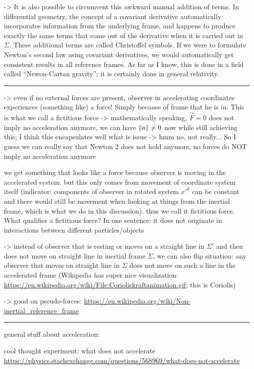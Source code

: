 \documentclass[../class_mech_main.tex]{subfiles}
\begin{document}
->  It is also possible to circumvent this awkward manual addition of terms. In differential geometry, the concept of a covariant derivative automatically incorporates information from the underlying frame, and happens to produce exactly the same terms that come out of the derivative when it is carried out in $\Sigma$. These additional terms are called Christoffel symbols. If we were to formulate Newton's second law using covariant derivatives, we would automatically get consistent results in all reference frames. As far as I know, this is done in a field called \enquote{Newon-Cartan gravity}; it is certainly done in general relativity.


\hrule


-> even if no external forces are present, observer in accelerating coordinates experiences (something like) a force! Simply because of frame that he is in. This is what we call a fictitious force -> mathematically speaking, $\vec{F} = 0$ does not imply no acceleration anymore, we can have $\norm{a} \neq 0$ now while still achieving this; I think this encapsulates well what is issue -> hmm no, not really... So I guess we can really say that Newton 2 does not hold anymore, no forces do NOT imply no acceleration anymore


we get something that looks like a force because observer is moving in the accelerated system. but this only comes from movement of coordinate system itself (indicator: components of observer in rotated system $x'^k$ can be constant and there would still be movement when looking at things from the inertial frame, which is what we do in this discussion). thus we call it fictitious force. What qualifies a fictitious force? In one sentence: it does not originate in interactions between different particles/objects


-> instead of observer that is resting or moves on a straight line in $\Sigma'$ and then does not move on straight line in inertial frame $\Sigma$, we can also flip situation: any observer that moves on straight line in $\Sigma$ does not move on such a line in the accelerated frame (Wikipedia has super nice visualization: \url{https://en.wikipedia.org/wiki/File:Corioliskraftanimation.gif}; this is Coriolis)

-> good on pseudo-forces: \url{https://en.wikipedia.org/wiki/Non-inertial_reference_frame}


\hrule

general stuff about acceleration:

cool thought experiment: what does not accelerate \url{https://physics.stackexchange.com/questions/568969/what-does-not-accelerate}
\end{document}
